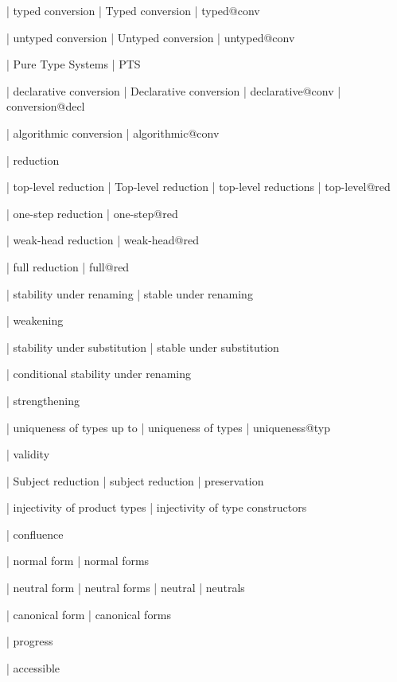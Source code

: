   | typed conversion
  | Typed conversion
  | typed@conv

  | untyped conversion
  | Untyped conversion
  | untyped@conv

  | Pure Type Systems
  | PTS

  | declarative conversion
  | Declarative conversion
  | declarative@conv
  | conversion@decl

  | algorithmic conversion
  | algorithmic@conv

  | reduction

  | top-level reduction
  | Top-level reduction
  | top-level reductions
  | top-level@red

  | one-step reduction
  | one-step@red

  | weak-head reduction
  | weak-head@red

  | full reduction
  | full@red

  | stability under renaming
  | stable under renaming

  | weakening

  | stability under substitution
  | stable under substitution

  | conditional stability under renaming

  | strengthening

  | uniqueness of types up to
  | uniqueness of types
  | uniqueness@typ

  | validity

  | Subject reduction
  | subject reduction
  | preservation

  | injectivity of product types
  | injectivity of type constructors

  | confluence

  | normal form
  | normal forms

  | neutral form
  | neutral forms
  | neutral
  | neutrals

  | canonical form
  | canonical forms

  | progress

  | accessible

